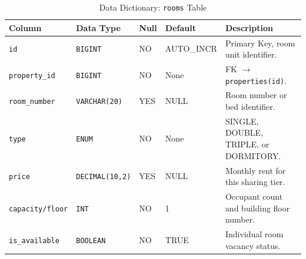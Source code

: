 \begin{table}[htbp]
\centering
\caption{Data Dictionary: \texttt{rooms} Table}
\label{tab:dict_rooms}
\footnotesize
\begin{tabularx}{\textwidth}{lp{2.5cm}lp{2.0cm}X}
\toprule
\textbf{Column} & \textbf{Data Type} & \textbf{Null} & \textbf{Default} & \textbf{Description} \\
\midrule
\texttt{id} & \texttt{BIGINT} & NO & AUTO\_INCR & Primary Key, room unit identifier. \\
\texttt{property\_id} & \texttt{BIGINT} & NO & None & FK $\rightarrow$ \texttt{properties(id)}. \\
\texttt{room\_number} & \texttt{VARCHAR(20)} & YES & NULL & Room number or bed identifier. \\
\texttt{type} & \texttt{ENUM} & NO & None & SINGLE, DOUBLE, TRIPLE, or DORMITORY. \\
\texttt{price} & \texttt{DECIMAL(10,2)}& YES & NULL & Monthly rent for this sharing tier. \\
\texttt{capacity/floor} & \texttt{INT} & NO & 1 & Occupant count and building floor number. \\
\texttt{is\_available} & \texttt{BOOLEAN} & NO & TRUE & Individual room vacancy status. \\
\bottomrule
\end{tabularx}
\end{table}


